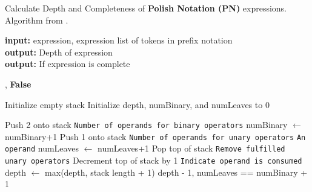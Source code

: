 \documentclass[12pt]{iopart}
\begin{document}
\begin{algorithm}
\scriptsize
\caption{Calculate Depth and Completeness of \textbf{Polish Notation (PN)} expressions. Algorithm from \cite{77180279}.}
\label{alg:getPNdepth}
\hspace*{\algorithmicindent} \textbf{input:}  expression, expression list of tokens in prefix notation \\
\hspace*{\algorithmicindent} \textbf{output:} Depth of expression\\
\hspace*{\algorithmicindent} \textbf{output:} If expression is complete 
\begin{algorithmic}[1] 
        \State {}, \textbf{False}
    \EndIf

    \State Initialize empty stack
    \State Initialize depth, numBinary, and numLeaves to 0

            \State Push 2 onto stack   \Comment\texttt{{Number of operands for binary operators}}
            \State numBinary $\gets$ numBinary+1
            \State Push 1 onto stack  \Comment\texttt{{Number of operands for unary operators}}
        \Else  \Comment\texttt{{An operand}}
            \State numLeaves $\gets$ numLeaves+1
                \State Pop top of stack \Comment\texttt{{Remove fulfilled unary operators}}
            \EndWhile
                \State Decrement top of stack by 1 \Comment\texttt{{Indicate operand is consumed}}
            \EndIf
        \EndIf
        \State  depth $\gets$ max(depth, stack length + 1)
    \EndFor
    \State \Return depth - 1, numLeaves == numBinary + 1 
\EndFunction
\end{algorithmic}
\end{algorithm}
\end{document}
